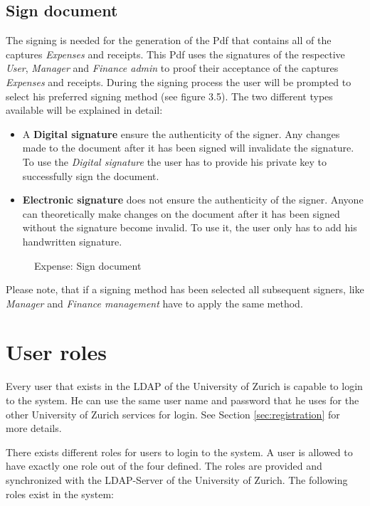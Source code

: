 \subsection{Sign document}
\label{sec:signing}
The signing is needed for the generation of the Pdf that contains all of the captures \textit{Expenses} and receipts. This Pdf uses the signatures of the respective \textit{User}, \textit{Manager} and \textit{Finance admin} to proof their acceptance of the captures \textit{Expenses} and receipts. During the signing process the user will be prompted to select his preferred signing method (see figure 3.5). The two different types available will be explained in detail:
    \begin{itemize}
        \item A \textbf{Digital signature} ensure the authenticity of the signer. Any changes made to the document after it has been signed will invalidate the signature. To use the \textit{Digital signature} the user has to provide his private key to successfully sign the document.
        \item \textbf{Electronic signature} does not ensure the authenticity of the signer. Anyone can theoretically make changes on the document after it has been signed without the signature become invalid. To use it, the user only has to add his handwritten signature.
    \end{itemize}
    
\begin{figure}[H]
    \centering
    \caption{Expense: Sign document}
    \label{fig:expense-sign}
\end{figure}

Please note, that if a signing method has been selected all subsequent signers, like \textit{Manager} and \textit{Finance management} have to apply the same method.


\section{User roles}
\label{user-roles}

Every user that exists in the LDAP of the University of Zurich is capable to login to the system. He can use the same user name and password that he uses for the other University of Zurich services for login. See Section \ref{sec:registration} for more details.

There exists different roles for users to login to the system. A user is allowed to have exactly one role out of the four defined. The roles are provided and synchronized with the LDAP-Server of the University of Zurich. The following roles exist in the system:

